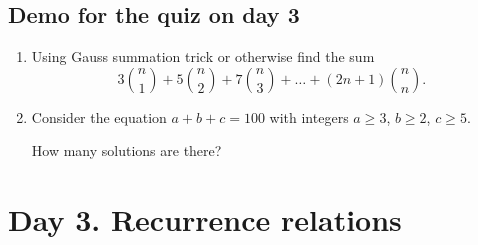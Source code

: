 \documentclass[12pt]{article}
\begin{document}
\subsection*{Demo for the quiz on day 3}

\begin{enumerate}

    \item Using Gauss summation trick or otherwise find the sum 
    \[
    3 {n \choose 1} + 5 {n \choose 2} + 7 {n \choose 3} + \dots + (2n + 1) {n \choose n}.
    \]
    \item Consider the equation $a + b + c = 100$ with integers $a \geq 3$, $b \geq 2$, $c\geq 5$.

    How many solutions are there?
    
\end{enumerate}

\section{Day 3. Recurrence relations}

\end{document}
